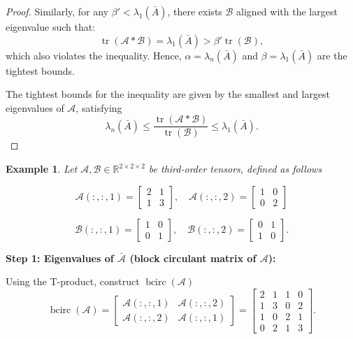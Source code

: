\documentclass[oupthm]{CUP-JNL-BCM}%
\theoremstyle{oupplain}
\theoremstyle{oupdefinition}
\theoremstyle{oupremark}
\newtheorem{example}[theorem]{Example}
\theoremstyle{oupproof}
\newtheorem{proof}{Proof}
\numberwithin{equation}{section}
\begin{document}
\begin{proof}
    \noindent Similarly, for any $\beta' < \lambda_1(\bar{A})$, there exists $\mathcal{B}$ aligned with the largest eigenvalue such that:
    \[
    \operatorname{tr}(\mathcal{A} * \mathcal{B}) = \lambda_1(\bar{A}) > \beta' \operatorname{tr}(\mathcal{B}),
    \]
    \noindent which also violates the inequality.   Hence, $\alpha = \lambda_n(\bar{A})$ and $\beta = \lambda_1(\bar{A})$ are the tightest bounds.

    \noindent The tightest bounds for the inequality are given by the smallest and largest eigenvalues of $\mathcal{A}$, satisfying
    \[
    \lambda_n(\bar{A}) \leq \frac{\operatorname{tr}(\mathcal{A} * \mathcal{B})}{\operatorname{tr}(\mathcal{B})} \leq \lambda_1(\bar{A}).
    \]
\end{proof}


\begin{example}
  Let \(\mathcal{A}, \mathcal{B} \in \mathbb{R}^{2 \times 2 \times 2}\) be third-order tensors, defined as follows

\[
\mathcal{A}(:, :, 1) = \begin{bmatrix} 2 & 1 \\ 1 & 3 \end{bmatrix}, \quad  
\mathcal{A}(:, :, 2) = \begin{bmatrix} 1 & 0 \\ 0 & 2 \end{bmatrix}
\]  

\[
\mathcal{B}(:, :, 1) = \begin{bmatrix} 1 & 0 \\ 0 & 1 \end{bmatrix}, \quad  
\mathcal{B}(:, :, 2) = \begin{bmatrix} 0 & 1 \\ 1 & 0 \end{bmatrix}.
\]  
  
\end{example}

\noindent \textbf{Step 1: Eigenvalues of \(\bar{\mathcal{A}}\) (block circulant matrix of \(\mathcal{A}\)):}

\noindent Using the T-product, construct \(\operatorname{bcirc}(\mathcal{A})\)
\[
\operatorname{bcirc}(\mathcal{A}) = 
\begin{bmatrix}
\mathcal{A}(:, :, 1) & \mathcal{A}(:, :, 2) \\
\mathcal{A}(:, :, 2) & \mathcal{A}(:, :, 1)
\end{bmatrix} =
\begin{bmatrix}
2 & 1 & 1 & 0 \\
1 & 3 & 0 & 2 \\
1 & 0 & 2 & 1 \\
0 & 2 & 1 & 3
\end{bmatrix}.
\]
\end{document}
